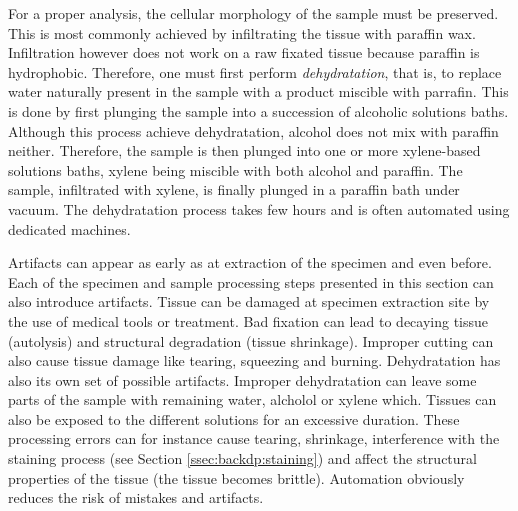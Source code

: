 For a proper analysis, the cellular morphology of the sample must be preserved. This is most commonly achieved by infiltrating the tissue with paraffin wax. Infiltration however does not work on a raw fixated tissue because paraffin is hydrophobic. Therefore, one must first perform \textit{dehydratation}, that is, to replace water naturally present in the sample with a product miscible with parrafin. This is done by first plunging the sample into a succession of alcoholic solutions baths. Although this process achieve dehydratation, alcohol does not mix with paraffin neither. Therefore, the sample is then plunged into one or more xylene-based solutions baths, xylene being miscible with both alcohol and paraffin. The sample, infiltrated with xylene, is finally plunged in a paraffin bath under vacuum. The dehydratation process takes few hours and is often automated using dedicated machines.  

Artifacts can appear as early as at extraction of the specimen and even before. Each of the specimen and sample processing steps presented in this section can also introduce artifacts. Tissue can be damaged at specimen extraction site by the use of medical tools or treatment. Bad fixation can lead to decaying tissue (\ie autolysis) and structural degradation (\eg tissue shrinkage). Improper cutting can also cause tissue damage like tearing, squeezing and burning. Dehydratation has also its own set of possible artifacts. Improper dehydratation can leave some parts of the sample with remaining water, alcholol or xylene which. Tissues can also be exposed to the different solutions for an excessive duration. These processing errors can for instance cause tearing, shrinkage, interference with the staining process (see Section \ref{ssec:backdp:staining}) and affect the structural properties of the tissue (\eg the tissue becomes brittle). Automation obviously reduces the risk of mistakes and artifacts.


  
    

